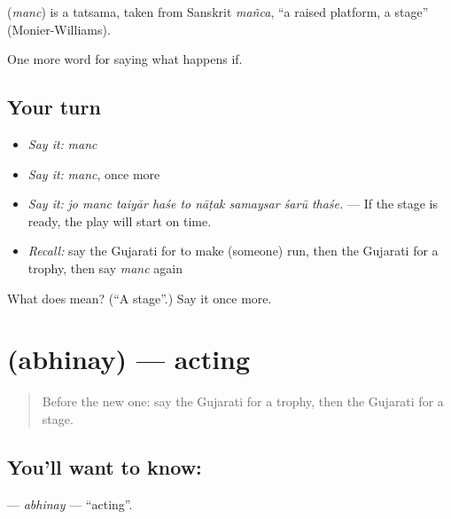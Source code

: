 \begin{cousinweb}
\textbf{} (\emph{manc}) is a tatsama, taken from Sanskrit \emph{mañca}, \textquotedblleft{}a raised platform, a stage\textquotedblright{} (Monier-Williams).
\end{cousinweb}

\begin{grammarlens}[title={What you've built}]
One more word for saying what happens if.
\end{grammarlens}

\subsection*{Your turn}
\begin{itemize}
\raggedright
  \item \emph{Say it:} \emph{manc}
  \item \emph{Say it:} \emph{manc}, once more
  \item \emph{Say it:} \emph{jo manc taiyār haśe to nāṭak samaysar śarū thaśe.} — If the stage is ready, the play will start on time.
  \item \emph{Recall:} say the Gujarati for to make (someone) run, then the Gujarati for a trophy, then say \emph{manc} again
\end{itemize}

\begin{tcolorbox}[breakable,colback=teal!4,colframe=teal!35!black,title={Before you move on}]
What does  mean? (\textquotedblleft{}A stage\textquotedblright{}.) Say it once more.
\end{tcolorbox}
\section[\texorpdfstring{\gu{અભિનય} (abhinay)}{અભિનય (abhinay)}]{ (abhinay) — acting}

\label{lesson:GU-C552-abhinay}



\begin{quote}
Before the new one: say the Gujarati for a trophy, then the Gujarati for a stage.
\end{quote}

\subsection*{You'll want to know: }
\textbf{} — \emph{abhinay} — \textquotedblleft{}acting\textquotedblright{}.

